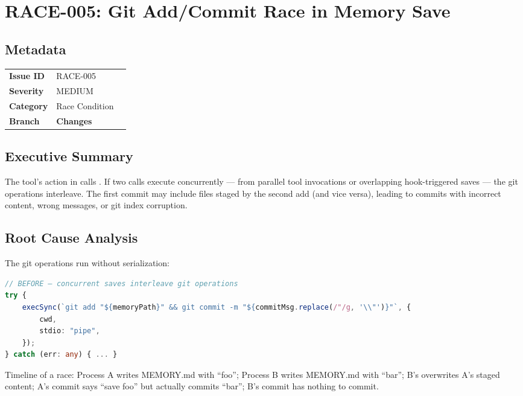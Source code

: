 \section{RACE-005: Git Add/Commit Race in Memory Save}
\label{sec:race-005}
\subsection*{Metadata}
\begin{tabular}{ll}
\textbf{Issue ID} & RACE-005 \\
\textbf{Severity} & MEDIUM \\
\textbf{Category} & Race Condition \\
\textbf{Branch} & 
\textbf{Changes} &  \\
\end{tabular}

\subsection*{Executive Summary}
The  tool's  action in  calls . If two  calls execute concurrently — from parallel tool invocations or overlapping hook-triggered saves — the git operations interleave. The first commit may include files staged by the second add (and vice versa), leading to commits with incorrect content, wrong messages, or git index corruption.

\subsection*{Root Cause Analysis}
The git operations run without serialization:

\begin{lstlisting}[language=TypeScript]
// BEFORE — concurrent saves interleave git operations
try {
    execSync(`git add "${memoryPath}" && git commit -m "${commitMsg.replace(/"/g, '\\"')}"`, {
        cwd,
        stdio: "pipe",
    });
} catch (err: any) { ... }
\end{lstlisting}

Timeline of a race: Process A writes MEMORY.md with ``foo''; Process B writes MEMORY.md with ``bar''; B's  overwrites A's staged content; A's commit says ``save foo'' but actually commits ``bar''; B's commit has nothing to commit.


